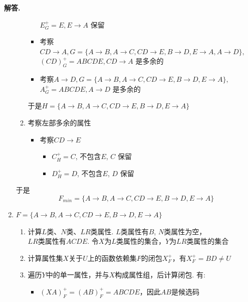 \documentclass[12pt, oneside]{ctexart}
\numberwithin{figure}{section}
\numberwithin{table}{section}
\newenvironment{solution}{\par\noindent\textbf{解答. }}{\par}
\begin{document}
\begin{solution}
\begin{enumerate}[(1)]
\begin{enumerate}[$1^\circ$]
\begin{itemize}
                        $E_G^+ = E, E \rightarrow A$ 保留
                        \item 考察$CD \rightarrow A, G = \{ A \rightarrow B, A \rightarrow C, CD \rightarrow E, B \rightarrow D, E \rightarrow A, A \rightarrow D \},$ \\
                        $(CD)_G^+ = ABCDE, CD \rightarrow A$ 是多余的
                        \item 考察$A \rightarrow D, G = \{ A \rightarrow B, A \rightarrow C, CD \rightarrow E, B \rightarrow D, E \rightarrow A \},$ \\
                        $A_G^+ = ABCDE, A \rightarrow D$ 是多余的
                    \end{itemize}
                    于是$H = \{ A \rightarrow B, A \rightarrow C, CD \rightarrow E, B \rightarrow D, E \rightarrow A \}$
                \item 考察左部多余的属性
                    \begin{itemize}
                        \item 考察$CD \rightarrow E$
                            \begin{itemize}
                                \item $C_H^+ = C$, 不包含$E$, $C$ 保留
                                \item $D_H^+ = D$, 不包含$E$, $D$ 保留
                            \end{itemize}
                    \end{itemize}
            \end{enumerate}
            于是$$F_{min} = \{ A \rightarrow B, A \rightarrow C, CD \rightarrow E, B \rightarrow D, E \rightarrow A \}$$
        \item $F = \{ A \rightarrow B, A \rightarrow C, CD \rightarrow E, B \rightarrow D, E \rightarrow A \}$
            \begin{enumerate}[$1^\circ$]
                \item 计算$L$类、$N$类、$LR$类属性. $L$类属性有$B$, $N$类属性为空，\\
                $LR$类属性有$ACDE$. 令$X$为$L$类属性的集合，$Y$为$LR$类属性的集合
                \item 计算属性集$X$关于$U$上的函数依赖集$F$的闭包$X_F^+$，有$X_F^+ = BD \not= U$
                \item 遍历$Y$中的单一属性，并与$X$构成属性组，后计算闭包. 有:
                    \begin{itemize}
                        \item $(XA)_F^+ = (AB)_F^+ = ABCDE$，因此$AB$是候选码

\end{itemize}
\end{enumerate}
\end{enumerate}
\end{solution}
\end{document}
